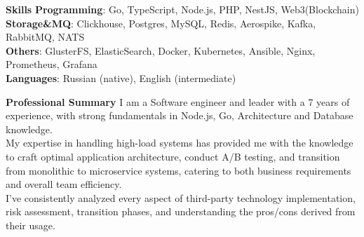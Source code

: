 \documentclass{resume} %
\begin{document}
\begin{rSection}{\textbf{Skills}}
       \textbf{Programming}: Go, TypeScript, Node.js, PHP, NestJS, Web3(Blockchain)
       \\ \textbf{Storage\&MQ}: Clickhouse, Postgres, MySQL, Redis, Aerospike, Kafka, RabbitMQ, NATS
       \\ \textbf{Others}: GlusterFS, ElasticSearch, Docker, Kubernetes, Ansible, Nginx, Prometheus, Grafana
       \\ \textbf{Languages}: Russian (native), English (intermediate)
\end{rSection}

\begin{rSection}{\textbf{Professional Summary}}
{ I am a Software engineer and leader with a 7 years of experience, with strong fundamentals in Node.js, Go, Architecture and Database
knowledge.
\\ My expertise in handling high-load systems has provided me with the knowledge to craft optimal application architecture, conduct A/B testing, and transition from monolithic to microservice systems, catering to both business requirements and overall team efficiency.
\\ I've consistently analyzed every aspect of third-party technology implementation, risk assessment, transition phases, and understanding the pros/cons derived from their usage.
}

\end{rSection}
\end{document}
